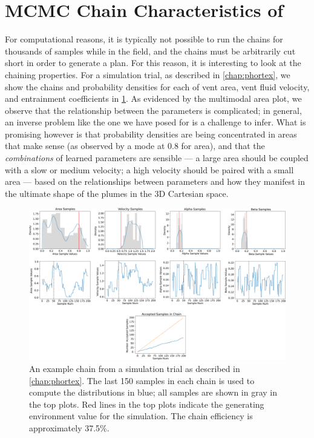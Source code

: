 \section{MCMC Chain Characteristics of \PHUMES}
For computational reasons, it is typically not possible to run the chains for thousands of samples while in the field, and the chains must be arbitrarily cut short in order to generate a plan. For this reason, it is interesting to look at the chaining properties. For a simulation trial, as described in \cref{chap:phortex}, we show the chains and probability densities for each of vent area, vent fluid velocity, and entrainment coefficients in \cref{fig:phumes_sim_chain}. As evidenced by the multimodal area plot, we observe that the relationship between the parameters is complicated; in general, an inverse problem like the one we have posed for \PHUMES is a challenge to infer. What is promising however is that probability densities are being concentrated in areas that make sense (as observed by a mode at 0.8 for area), and that the \emph{combinations} of learned parameters are sensible --- a large area should be coupled with a slow or medium velocity; a high velocity should be paired with a small area --- based on the relationships between parameters and how they manifest in the ultimate shape of the plumes in the 3D Cartesian space.

\begin{figure}[h!]
    \centering
    \includegraphics[width=1\columnwidth]{figures/phumes_trial_chain.png}
    \caption[\PHUMES simulation chain]{An example chain from a simulation trial as described in \cref{chap:phortex}. The last 150 samples in each chain is used to compute the distributions in blue; all samples are shown in gray in the top plots. Red lines in the top plots indicate the generating environment value for the simulation. The chain efficiency is approximately 37.5\%.}
    \label{fig:phumes_sim_chain}
\end{figure}

